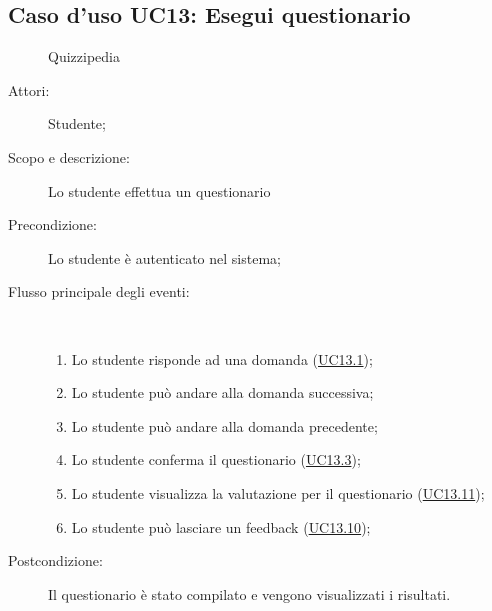 \subsection{Caso d'uso UC13: Esegui questionario}
	\begin{figure}[H]
		\centering
		\begin{resizedtikzpicture}{\textwidth}
		\begin{umlsystem}[x=0, fill=lightgray!20]{Quizzipedia}
		\end{umlsystem}
		\end{resizedtikzpicture}
		\caption{}
	\end{figure}
\begin{description}
\item[Attori:] Studente;
\item[Scopo e descrizione:] Lo studente effettua un questionario
      \item[Precondizione:] Lo studente è autenticato nel sistema;

        \item[Flusso principale degli eventi:] \ 
 \begin{enumerate}
          \item Lo studente risponde ad una domanda (\hyperlink{UC13.1}{UC13.1});
          \item Lo studente può andare alla domanda successiva;
          \item Lo studente può andare alla domanda precedente;
          \item Lo studente conferma il questionario (\hyperlink{UC13.3}{UC13.3});
          \item Lo studente visualizza la valutazione per il questionario (\hyperlink{UC13.11}{UC13.11});
          \item Lo studente può lasciare un feedback (\hyperlink{UC13.10}{UC13.10});

      \end{enumerate}
    \item[Postcondizione:] Il questionario è stato compilato e vengono visualizzati i risultati.
  \end{description}
\hypertarget{UC13.1}{}

